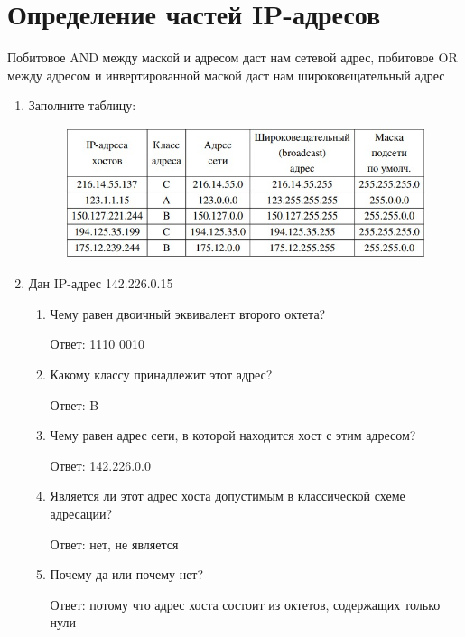 \documentclass[bachelor, och, labwork]{shiza}
\begin{document}
\section{Определение частей IP-адресов}

    Побитовое AND между маской и адресом даст нам сетевой адрес, побитовое OR между адресом и инвертированной маской даст нам широковещательный адрес

\begin{enumerate}
    \item Заполните таблицу:
    
    \begin{figure}[H]
        \centering      %
        \includegraphics[width=1\textwidth]{2}
        \label{fig:image1}
    \end{figure}

    \item Дан IP-адрес 142.226.0.15
    \begin{enumerate}
        \item Чему равен двоичный эквивалент второго октета? 
        
        Ответ: 1110 0010
        \item Какому классу принадлежит этот адрес? 
        
        Ответ: B
        \item Чему равен адрес сети, в которой находится хост с этим адресом? 
        
        Ответ: 142.226.0.0
        \item Является ли этот адрес хоста допустимым в классической схеме адресации? 
        
        Ответ: нет, не является
        \item Почему да или почему нет? 
        
        Ответ: потому что адрес хоста состоит из октетов, содержащих только нули
    \end{enumerate}
\end{enumerate}
\end{document}
